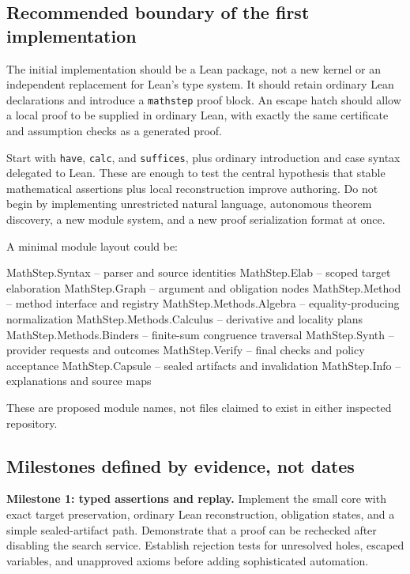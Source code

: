 \documentclass[11pt,a4paper]{article}
\theoremstyle{remark}
\newcommand{\ty}[1]{\texttt{#1}}
\begin{document}
\subsection{Recommended boundary of the first implementation}
The initial implementation should be a Lean package, not a new kernel or an independent replacement for Lean's type system. It should retain ordinary Lean declarations and introduce a \ty{mathstep} proof block. An escape hatch should allow a local proof to be supplied in ordinary Lean, with exactly the same certificate and assumption checks as a generated proof.

Start with \ty{have}, \ty{calc}, and \ty{suffices}, plus ordinary introduction and case syntax delegated to Lean. These are enough to test the central hypothesis that stable mathematical assertions plus local reconstruction improve authoring. Do not begin by implementing unrestricted natural language, autonomous theorem discovery, a new module system, and a new proof serialization format at once.

A minimal module layout could be:
\Needspace{154pt}
\begin{code}
MathStep.Syntax           -- parser and source identities
MathStep.Elab             -- scoped target elaboration
MathStep.Graph            -- argument and obligation nodes
MathStep.Method           -- method interface and registry
MathStep.Methods.Algebra  -- equality-producing normalization
MathStep.Methods.Calculus -- derivative and locality plans
MathStep.Methods.Binders  -- finite-sum congruence traversal
MathStep.Synth            -- provider requests and outcomes
MathStep.Verify           -- final checks and policy acceptance
MathStep.Capsule          -- sealed artifacts and invalidation
MathStep.Info             -- explanations and source maps
\end{code}
These are proposed module names, not files claimed to exist in either inspected repository.

\subsection{Milestones defined by evidence, not dates}
\textbf{Milestone 1: typed assertions and replay.} Implement the small core with exact target preservation, ordinary Lean reconstruction, obligation states, and a simple sealed-artifact path. Demonstrate that a proof can be rechecked after disabling the search service. Establish rejection tests for unresolved holes, escaped variables, and unapproved axioms before adding sophisticated automation.
\end{document}

